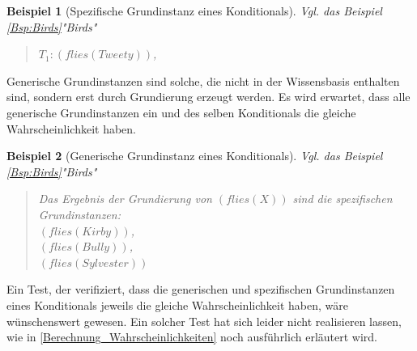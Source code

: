 \documentclass[draft]{scrreprt}
\newtheorem{Bsp}{Beispiel}[section]
\begin{document}
{\label{Bsp:Spez Grundinstanz} 
\begin{Bsp}[Spezifische Grundinstanz eines Konditionals]
	Vgl. das Beispiel \\ \ref{Bsp:Birds}"{}Birds"{}
	\begin{quote}
		$ T_{1}  :  (flies(Tweety)) $,\\
	\end{quote}
\end{Bsp}

Generische Grundinstanzen sind solche, die nicht in der Wissensbasis enthalten sind, sondern erst durch Grundierung erzeugt werden. 
Es wird erwartet, dass alle generische Grundinstanzen ein und des selben Konditionals die gleiche Wahrscheinlichkeit haben.

\label{Bsp:Gen Grundinstanz} 
\begin{Bsp}[Generische Grundinstanz eines Konditionals]
	Vgl. das Beispiel \\ \ref{Bsp:Birds}"{}Birds"{}
	\begin{quote}
		Das Ergebnis der Grundierung von $ (flies(X)) $ sind die spezifischen Grundinstanzen:\\
		$ (flies(Kirby)) $,\\
		$ (flies(Bully)) $,\\
		$ (flies(Sylvester)) $\\
		
	\end{quote}
\end{Bsp}

Ein Test, der verifiziert, dass die generischen und spezifischen Grundinstanzen eines Konditionals jeweils die gleiche Wahrscheinlichkeit haben, wäre wünschenswert gewesen. Ein solcher Test hat sich leider nicht realisieren lassen, wie in \ref{Berechnung_Wahrscheinlichkeiten} noch ausführlich erläutert wird.


}
\end{document}
